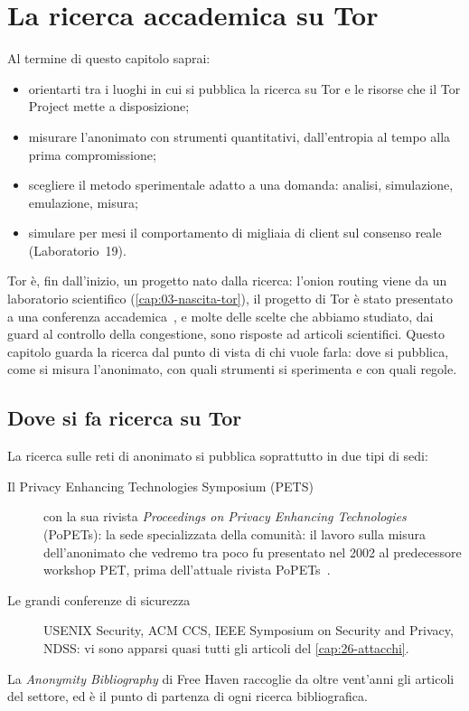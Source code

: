 \chapter{La ricerca accademica su Tor}\label{cap:29-ricerca}

\begin{obiettivi}
Al termine di questo capitolo saprai:
\begin{itemize}[nosep]
  \item orientarti tra i luoghi in cui si pubblica la ricerca su Tor e le risorse che il Tor Project mette a disposizione;
  \item misurare l'anonimato con strumenti quantitativi, dall'entropia al tempo alla prima compromissione;
  \item scegliere il metodo sperimentale adatto a una domanda: analisi, simulazione, emulazione, misura;
  \item simulare per mesi il comportamento di migliaia di client sul consenso reale (Laboratorio~19).
\end{itemize}
\end{obiettivi}

Tor è, fin dall'inizio, un progetto nato dalla ricerca: l'onion routing viene da un laboratorio scientifico (\cref{cap:03-nascita-tor}), il progetto di Tor è stato presentato a una conferenza accademica~\cite{dingledine2004tor}, e molte delle scelte che abbiamo studiato, dai guard al controllo della congestione, sono risposte ad articoli scientifici. Questo capitolo guarda la ricerca dal punto di vista di chi vuole farla: dove si pubblica, come si misura l'anonimato, con quali strumenti si sperimenta e con quali regole.

\section{Dove si fa ricerca su Tor}\label{sec:ric-dove}

La ricerca sulle reti di anonimato si pubblica soprattutto in due tipi di sedi:
\begin{description}
  \item[Il Privacy Enhancing Technologies Symposium (PETS)] con la sua rivista \emph{Proceedings on Privacy Enhancing Technologies} (PoPETs): la sede specializzata della comunità: il lavoro sulla misura dell'anonimato che vedremo tra poco fu presentato nel 2002 al predecessore workshop PET, prima dell'attuale rivista PoPETs~\cite{diaz2002measuring}.
  \item[Le grandi conferenze di sicurezza] USENIX Security, ACM CCS, IEEE Symposium on Security and Privacy, NDSS: vi sono apparsi quasi tutti gli articoli del \cref{cap:26-attacchi}.
\end{description}
La \emph{Anonymity Bibliography} di Free Haven raccoglie da oltre vent'anni gli articoli del settore, ed è il punto di partenza di ogni ricerca bibliografica.

